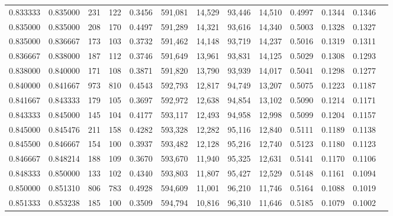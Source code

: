 \begin{tabular}{rrrrrrrrrrrrr}
0.833333 & 0.835000 &   231 & 122 &                                     0.3456 & 591,081 &  14,529 &  93,446 &  14,510 & 0.4997 & 0.1344 & 0.1346 \\
0.835000 & 0.835000 &   208 & 170 &                                     0.4497 & 591,289 &  14,321 &  93,616 &  14,340 & 0.5003 & 0.1328 & 0.1327 \\
0.835000 & 0.836667 &   173 & 103 &                                     0.3732 & 591,462 &  14,148 &  93,719 &  14,237 & 0.5016 & 0.1319 & 0.1311 \\
0.836667 & 0.838000 &   187 & 112 &                                     0.3746 & 591,649 &  13,961 &  93,831 &  14,125 & 0.5029 & 0.1308 & 0.1293 \\
0.838000 & 0.840000 &   171 & 108 &                                     0.3871 & 591,820 &  13,790 &  93,939 &  14,017 & 0.5041 & 0.1298 & 0.1277 \\
0.840000 & 0.841667 &   973 & 810 &                                     0.4543 & 592,793 &  12,817 &  94,749 &  13,207 & 0.5075 & 0.1223 & 0.1187 \\
0.841667 & 0.843333 &   179 & 105 &                                     0.3697 & 592,972 &  12,638 &  94,854 &  13,102 & 0.5090 & 0.1214 & 0.1171 \\
0.843333 & 0.845000 &   145 & 104 &                                     0.4177 & 593,117 &  12,493 &  94,958 &  12,998 & 0.5099 & 0.1204 & 0.1157 \\
0.845000 & 0.845476 &   211 & 158 &                                     0.4282 & 593,328 &  12,282 &  95,116 &  12,840 & 0.5111 & 0.1189 & 0.1138 \\
0.845500 & 0.846667 &   154 & 100 &                                     0.3937 & 593,482 &  12,128 &  95,216 &  12,740 & 0.5123 & 0.1180 & 0.1123 \\
0.846667 & 0.848214 &   188 & 109 &                                     0.3670 & 593,670 &  11,940 &  95,325 &  12,631 & 0.5141 & 0.1170 & 0.1106 \\
0.848333 & 0.850000 &   133 & 102 &                                     0.4340 & 593,803 &  11,807 &  95,427 &  12,529 & 0.5148 & 0.1161 & 0.1094 \\
0.850000 & 0.851310 &   806 & 783 &                                     0.4928 & 594,609 &  11,001 &  96,210 &  11,746 & 0.5164 & 0.1088 & 0.1019 \\
0.851333 & 0.853238 &   185 & 100 &                                     0.3509 & 594,794 &  10,816 &  96,310 &  11,646 & 0.5185 & 0.1079 & 0.1002 \\

\end{tabular}
